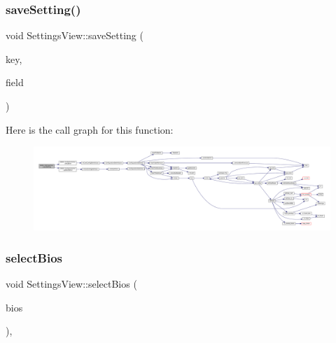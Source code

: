 \subsubsection{\texorpdfstring{save\+Setting()}{saveSetting()}\hspace{0.1cm}{\footnotesize\ttfamily [7/7]}}
{\footnotesize\ttfamily void Settings\+View\+::save\+Setting (\begin{DoxyParamCaption}\item[{const char $\ast$}]{key,  }\item[{const Q\+Variant \&}]{field }\end{DoxyParamCaption})\hspace{0.3cm}{\ttfamily [private]}}

Here is the call graph for this function\+:
\nopagebreak
\begin{figure}[H]
\begin{center}
\leavevmode
\includegraphics[width=350pt]{class_q_g_b_a_1_1_settings_view_afcd43696948628ead551449451d2c0f6_cgraph}
\end{center}
\end{figure}
\mbox{\label{class_q_g_b_a_1_1_settings_view_a041bcef005f9f02600d2499f9dc04820}} 
\subsubsection{\texorpdfstring{select\+Bios}{selectBios}}
{\footnotesize\ttfamily void Settings\+View\+::select\+Bios (\begin{DoxyParamCaption}\item[{Q\+Line\+Edit $\ast$}]{bios }\end{DoxyParamCaption})\hspace{0.3cm}{\ttfamily [private]}, {\ttfamily [slot]}}


